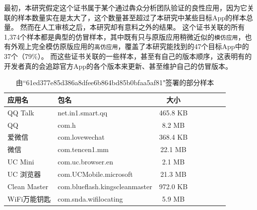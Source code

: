最初，本研究假定这个证书属于某个通过犇众分析团队验证的良性应用，因为它关联的样本数量实在是太大了，这个数量甚至超过了本研究中某些目标App的样本总量。
然而在人工审核之后，本研究却有意料之外的结果。
这个证书关联的所有1,374个样本都是典型的仿冒样本，其中既有只与原版应用稍微近似的\texttt{模仿应用}，也有外观上完全模仿原版应用的\texttt{高仿应用}，覆盖了本研究能找到的47个目标App中的37个（79\%）。
而这些证书关联的一些样本，甚至有自己的版本顺序，这表明有的开发者真的会追踪官方App的各个版本来更新、甚至维护自己的仿冒版本。

\begin{table}[htbp]
    \renewcommand{\arraystretch}{1}
    \small
    \centering
    \caption{由``61ed377e85d386a8dfee6b864bd85b0bfaa5af81"签署的部分样本}
    \vspace{1mm}
    \begin{tabular}{l l c c c c c c}
        \toprule
        {\bf 应用名} & {\bf 包名} & {\bf 大小} \\
        \midrule
        QQ Talk  & net.in1.smart.qq & 465.8 KB \\
        QQ  & com.h & 8.2 MB \\
        爱微信  & com.lovewechat & 368.4 KB \\
        微信  & com.tencen1.mm & 22.1 MB \\
        UC Mini  & com.uc.browser.en & 2.1 MB \\
        UC 浏览器  & com.UCMobile.microsoft & 21.3 MB \\
        Clean Master  & com.blueflash.kingscleanmaster & 972.0 KB \\
        WiFi万能钥匙  & com.snda.wifilocating & 5.9 MB \\
        \bottomrule
    \end{tabular}
    \label{table:certificate_case_study}
\end{table}

